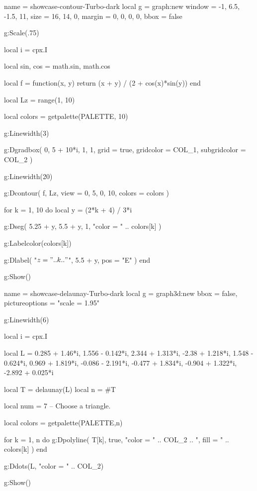 \documentclass[theme = dark]{tutodoc}
\newcommand{\PALETTE}{Turbo}
\begin{document}
\begin{luadraw}{name = showcase-contour-\PALETTE-dark}
local g = graph:new{
  window = {-1, 6.5, -1.5, 11},
  size   = {16, 14, 0},
  margin = {0, 0, 0, 0},
  bbox   = false
}

g:Scale(.75)

local i = cpx.I

local sin, cos = math.sin, math.cos

local f = function(x, y)
  return (x + y) / (2 + cos(x)*sin(y))
end

local Lz = range(1, 10)

local colors = getpalette(PALETTE, 10)

g:Linewidth(3)

g:Dgradbox(
  {0, 5 + 10*i, 1, 1},
  {
    grid         = true,
    gridcolor    = COL_1,
    subgridcolor = COL_2
  }
)

g:Linewidth(20)

g:Dcontour(
  f,
  Lz,
  {
    view   = {0, 5, 0, 10},
    colors = colors
  }
)

for k = 1, 10 do
  local y = (2*k + 4) / 3*i

  g:Dseg(
    {5.25 + y, 5.5 + y},
    1,
    "color = " .. colors[k]
  )

  g:Labelcolor(colors[k])

  g:Dlabel(
    "$z = " .. k .. "$",
    5.5 + y,
    {pos = "E"}
  )
end

g:Show()
\end{luadraw}



\vfill

\begin{luadraw}{name = showcase-delaunay-\PALETTE-dark}
local g = graph3d:new{
  bbox           = false,
  pictureoptions = "scale = 1.95"
}

g:Linewidth(6)

local i = cpx.I

local L = {
   0.285 + 1.46*i,
   1.556 - 0.142*i,
   2.344 + 1.313*i,
  -2.38  + 1.218*i,
   1.548 - 0.624*i,
   0.969 + 1.819*i,
  -0.086 - 2.191*i,
  -0.477 + 1.834*i,
  -0.904 + 1.322*i,
  -2.892 + 0.025*i
} 

local T = delaunay(L)
local n = #T

local num = 7 -- Choose a triangle.

local colors = getpalette(PALETTE,n) 

for k = 1, n do
  g:Dpolyline(
    T[k],
    true,
       "color = " .. COL_2
    .. ", fill = " .. colors[k]
  ) 
end

g:Ddots(L, "color = " .. COL_2)

g:Show()
\end{luadraw}
\end{document}
